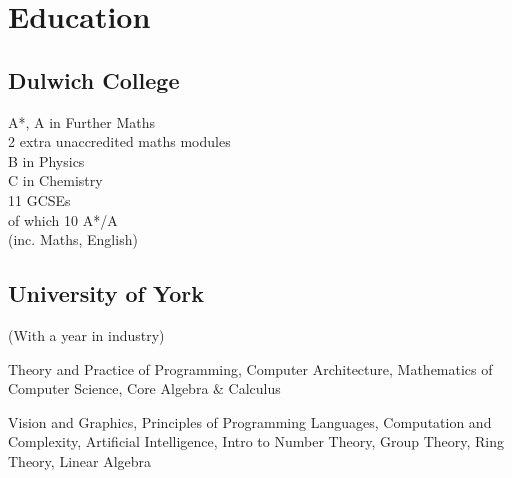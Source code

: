 \documentclass[a4paper]{cv}
\begin{document}
\begin{minipage}[t]{0.8\textwidth}\centering


\section{Education}

\begin{minipage}[t]{0.4\textwidth}
\subsection{Dulwich College}

A*, A in Further Maths \\
2 extra unaccredited maths modules \\
B in Physics \\
C in Chemistry \\\vspace{4pt}
11 GCSEs \\
of which 10 A*/A \\
(inc. Maths, English)

\end{minipage}
\begin{minipage}[t]{0.55\textwidth}
\subsection{University of York}

(With a year in industry) \\\vspace{4pt}

Theory and Practice of Programming,
Computer Architecture,
Mathematics of Computer Science,
Core Algebra \& Calculus \\\vspace{4pt}

Vision and Graphics,
Principles of Programming Languages,
Computation and Complexity,
Artificial Intelligence,
Intro to Number Theory,
Group Theory,
Ring Theory,
Linear Algebra \\\vspace{4pt}


\end{minipage}
\end{minipage}
\end{document}
